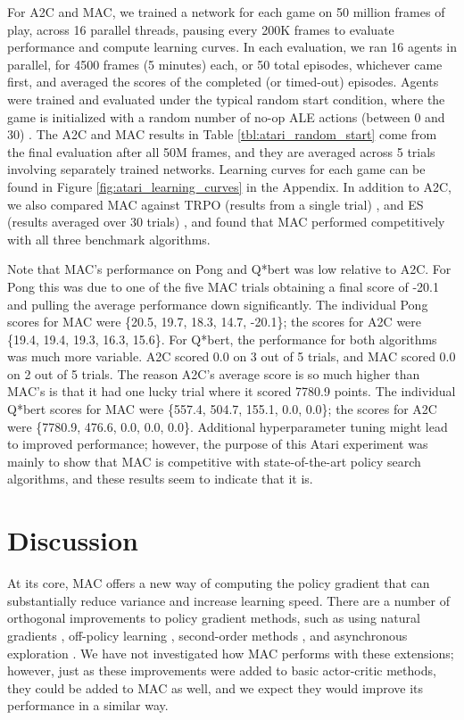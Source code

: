 \documentclass[letterpaper]{article}
\begin{document}
For A2C and MAC, we trained a network for each game on 50 million frames of play, across 16 parallel threads, pausing every 200K frames to evaluate performance and compute learning curves. In each evaluation, we ran 16 agents in parallel, for 4500 frames (5 minutes) each, or 50 total episodes, whichever came first, and averaged the scores of the completed (or timed-out) episodes. Agents were trained and evaluated under the typical random start condition, where the game is initialized with a random number of no-op ALE actions (between 0 and 30) \cite{mnih2015human}. The A2C and MAC results in Table \ref{tbl:atari_random_start} come from the final evaluation after all 50M frames, and they are averaged across 5 trials involving separately trained networks. Learning curves for each game can be found in Figure \ref{fig:atari_learning_curves} in the Appendix. In addition to A2C, we also compared MAC against TRPO (results from a single trial) \cite{schulman2015trust}, and ES (results averaged over 30 trials) \cite{salimans2017evolution}, and found that MAC performed competitively with all three benchmark algorithms.

Note that MAC's performance on Pong and Q*bert was low relative to A2C. For Pong this was due to one of the five MAC trials obtaining a final score of -20.1 and pulling the average performance down significantly. The individual Pong scores for MAC were \{20.5, 19.7, 18.3, 14.7, -20.1\}; the scores for A2C were \{19.4, 19.4, 19.3, 16.3, 15.6\}. For Q*bert, the performance for both algorithms was much more variable. A2C scored 0.0 on 3 out of 5 trials, and MAC scored 0.0 on 2 out of 5 trials. The reason A2C's average score is so much higher than MAC's is that it had one lucky trial where it scored 7780.9 points. The individual Q*bert scores for MAC were \{557.4, 504.7, 155.1, 0.0, 0.0\}; the scores for A2C were \{7780.9, 476.6, 0.0, 0.0, 0.0\}. Additional hyperparameter tuning might lead to improved performance; however, the purpose of this Atari experiment was mainly to show that MAC is competitive with state-of-the-art policy search algorithms, and these results seem to indicate that it is.

\section{Discussion}
At its core, MAC offers a new way of computing the policy gradient that can substantially reduce variance and increase learning speed. There are a number of orthogonal improvements to policy gradient methods, such as using natural gradients \cite{kakade2002natural,peters2008natural}, off-policy learning \cite{wang2016sample,gu2016q,asadi2016sample}, second-order methods
\cite{furmston2016approximate}, and asynchronous exploration \cite{mnih2016asynchronous}. We have not investigated how MAC performs with these extensions; however, just as these improvements were added to basic actor-critic methods, they could be added to MAC as well, and we expect they would improve its performance in a similar way.
\end{document}
